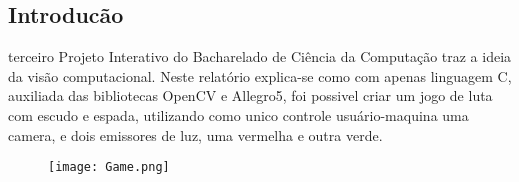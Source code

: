 \documentclass[12pt]{sciposter}
\begin{document}
\begin{multicols}{3}

\section{Introducão}

 terceiro Projeto Interativo do Bacharelado de Ciência da Computação traz a ideia da visão computacional.
Neste relatório explica-se como com apenas linguagem C, auxiliada das bibliotecas OpenCV e Allegro5, foi possivel criar um jogo de luta com escudo e espada, utilizando como unico controle usuário-maquina uma camera, e dois emissores de luz, uma vermelha e outra verde.

\begin{figure}[!htb]
    \centering
    \texttt{[image: Game.png]}
\end{figure}


\end{multicols}
\end{document}
